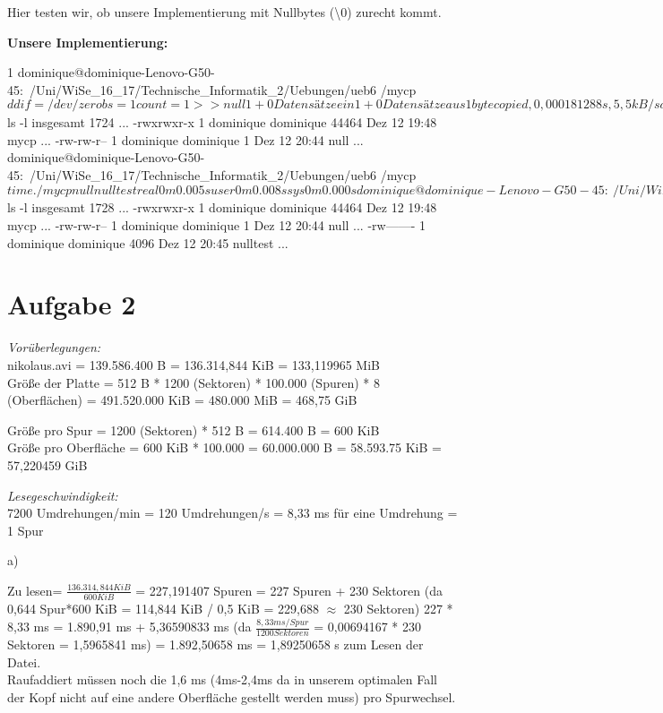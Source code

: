 \documentclass{ti2}
\begin{document}
Hier testen wir, ob unsere Implementierung mit Nullbytes (\textbackslash 0) zurecht kommt.

\textbf{Unsere Implementierung:}
\begin{listing}{1}
dominique@dominique-Lenovo-G50-45:~/Uni/WiSe_16_17/Technische_Informatik_2/Uebungen/ueb6
/mycp$ dd if=/dev/zero bs=1 count=1 >> null
1+0 Datensätze ein
1+0 Datensätze aus
1 byte copied, 0,000181288 s, 5,5 kB/s
dominique@dominique-Lenovo-G50-45:~/Uni/WiSe_16_17/Technische_Informatik_2/Uebungen/ueb6
/mycp$ ls -l
insgesamt 1724
...
-rwxrwxr-x 1 dominique dominique  44464 Dez 12 19:48 mycp
...
-rw-rw-r-- 1 dominique dominique      1 Dez 12 20:44 null
...
dominique@dominique-Lenovo-G50-45:~/Uni/WiSe_16_17/Technische_Informatik_2/Uebungen/ueb6
/mycp$ time ./mycp null nulltest

real	0m0.005s
user	0m0.008s
sys	0m0.000s
dominique@dominique-Lenovo-G50-45:~/Uni/WiSe_16_17/Technische_Informatik_2/Uebungen/ueb6
/mycp$ ls -l
insgesamt 1728
...
-rwxrwxr-x 1 dominique dominique  44464 Dez 12 19:48 mycp
...
-rw-rw-r-- 1 dominique dominique      1 Dez 12 20:44 null
...
-rw------- 1 dominique dominique   4096 Dez 12 20:45 nulltest
...

\end{listing}
\section*{Aufgabe 2}
\textit{Vorüberlegungen:} \\
nikolaus.avi = 139.586.400 B = 136.314,844 KiB = 133,119965 MiB \\
Größe der Platte = 512 B * 1200 (Sektoren) * 100.000 (Spuren) * 8 (Oberflächen)  = 491.520.000 KiB = 480.000 MiB = 468,75 GiB
			
Größe pro Spur = 1200 (Sektoren) * 512 B = 614.400 B = 600 KiB\\
Größe pro Oberfläche = 600 KiB * 100.000 = 60.000.000 B = 58.593.75 KiB = 57,220459 GiB

\textit{Lesegeschwindigkeit:}\\
7200 Umdrehungen/min = 120 Umdrehungen/s = 8,33 ms für eine Umdrehung = 1 Spur 

a)

Zu lesen= $\frac{136.314,844 KiB}{600 KiB}$ = 227,191407 Spuren = 227 Spuren + 230 Sektoren (da 0,644 Spur*600 KiB = 114,844 KiB / 0,5 KiB = 229,688 $\approx$ 230 Sektoren) 
227 * 8,33 ms = 1.890,91 ms + 5,36590833 ms (da $\frac{8,33ms/Spur}{1200 Sektoren}$ = 0,00694167 * 230 Sektoren = 1,5965841 ms) = 1.892,50658 ms = 1,89250658 s zum Lesen der Datei. \\
Raufaddiert müssen noch die 1,6 ms (4ms-2,4ms da in unserem optimalen Fall der Kopf nicht auf eine andere Oberfläche gestellt werden muss) pro Spurwechsel.
\end{document}
